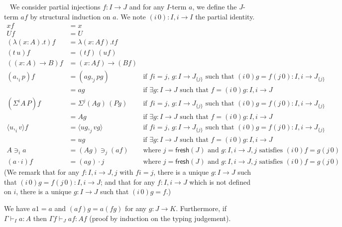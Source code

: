 \documentclass[english]{PaperTools/latex/lipics}
\newcommand\CP[3]{(#2,_{#1} #3)}
\newcommand\op[1]{∋_{#1}}
\newcommand\ip[3]{Σ^{#1} {#2}\,{#3}}
\newcommand\fp[3]{⟨#2 ,_{#1} #3⟩}
\def\fresh#1{\mathsf{fresh}(#1)}
\begin{document}
\begin{definition}~
  \label{def:color-subst}
  We consider partial injections $f : I → J$ and for any $I$-term $a$,
  we define the $J$-term $af$ by structural induction on $a$.
  We note $(i\,0) : I,i → I$ the partial identity.
\begin{align*}
  x f & = x \\
  U f & = U \\
  (λ(x:A).t) f &= λ(x:Af).tf \\
  (t\,u) f &= (tf) \, (uf) \\
  ((x:A)→B) f &= (x:Af)→(Bf) \\
  \CP {i} a p f &= \CP {j} {ag} {pg}
    & \text{if $fi = j$, $g : I→J_{\{j\}}$ such that $(i\,0)g = f(j\,0) : I,i → J_{\{j\}}$} \\
                &= ag
    & \text{if $∃g : I→J$ such that $f = (i\,0)g : I,i → J$} \\
  (\ip {i} A P) f &= \ip {j} {(Ag)} {(Pg)}
    & \text{if $fi = j$, $g : I→J_{\{j\}}$ such that $(i\,0)g = f(j\,0) : I,i → J_{\{j\}}$} \\
                &= Ag
    & \text{if $∃g : I→J$ such that $f = (i\,0)g : I,i → J$} \\
  \fp {i} u v f &= \fp {j} {ug} {vg}
    & \text{if $fi = j$, $g : I→J_{\{j\}}$ such that $(i\,0)g = f(j\,0) : I,i → J_{\{j\}}$} \\
                &= ug
    & \text{if $∃g : I→J$ such that $f = (i\,0)g : I,i → J$} \\
  A \op {i} a &= (Ag) \op {j} (af)
    & \text{where $j = \fresh J$ and $g:I,i → J,j$ satisfies $(i\,0)f = g(j\,0)$} \\
  (a · i) f &= (ag) · j
    & \text{where $j = \fresh J$ and $g:I,i → J,j$ satisfies $(i\,0)f = g(j\,0)$}
\end{align*}
  (We remark that for any $f : I,i → J,j$ with $fi=j$, there is a
  unique $g : I → J$ such that $(i\,0)g = f(j\,0) : I,i → J$;
  and that for any $f : I,i → J$ which is not defined on $i$, there is
  a unique $g : I → J$ such that $(i\,0)g = f$.)

  We have $a1 = a$ and $(af)g = a(fg)$ for any $g : J → K$.
  Furthermore, if $Γ ⊢_I a : A$ then $Γ f ⊢_J af : Af$ (proof by
  induction on the typing judgement).
\end{definition}
\end{document}
